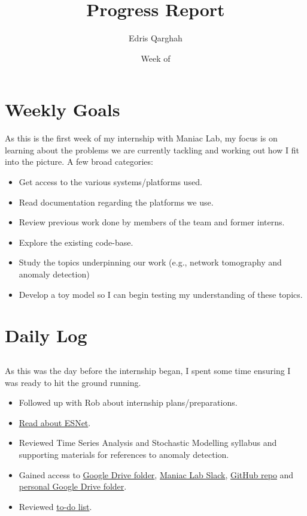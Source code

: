 \documentclass{weeklyreport}
\title{Progress Report}
\author{Edris Qarghah}
\date{Week of \DTMusedate{reportdate}}
\begin{document}
\maketitle

\newpage

\section*{Weekly Goals}

As this is the first week of my internship with Maniac Lab, my focus is on learning about the problems we are currently tackling and working out how I fit into the picture. A few broad categories:

\begin{itemize}
    \item Get access to the various systems/platforms used.
    \item Read documentation regarding the platforms we use.
    \item Review previous work done by members of the team and former interns.
    \item Explore the existing code-base.
    \item Study the topics underpinning our work (e.g., network tomography and anomaly detection)
    \item Develop a toy model so I can begin testing my understanding of these topics.
\end{itemize}

\section*{Daily Log}

\subsection*{}

As this was the day before the internship began, I spent some time ensuring I was ready to hit the ground running.

\begin{itemize}
    \item Followed up with Rob about internship plans/preparations.
    \item \href{http://fasterdata.es.net/}{Read about ESNet}.
    \item Reviewed Time Series Analysis and Stochastic Modelling syllabus and supporting materials for references to anomaly detection.
    \item Gained access to \href{https://drive.google.com/drive/folders/1LlhbC0ow-dP2951RGwzURHQR_Z-0Le49?usp=sharing}{Google Drive folder}, \href{maniaclab.slack.com}{Maniac Lab Slack}, \href{https://github.com/maniaclab}{GitHub repo} and \href{https://docs.google.com/spreadsheets/d/10iPIfkq8TFPfNK93lgzEhBOzboEUTsx34XXU0fODKdk/edit?usp=sharing}{personal Google Drive folder}. 
    \item Reviewed \href{https://docs.google.com/document/d/1BDMqB2Bx64U3y_RKzZUxt2BklE5qFCcum5ZtTpWbBDA/edit?usp=sharing}{to-do list}.
\end{itemize}
\end{document}
